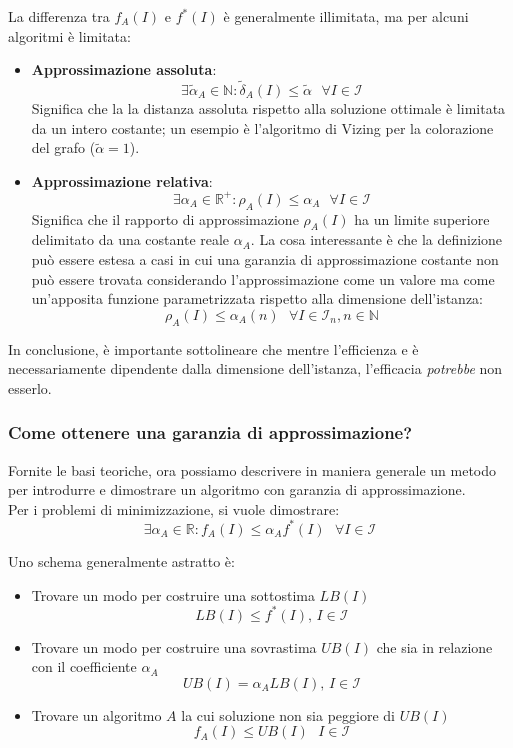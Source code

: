 \documentclass{article}
\begin{document}
La differenza tra $f_A(I)$ e $f^*(I)$ è generalmente illimitata, ma per alcuni algoritmi è limitata:
\begin{itemize}
    \item \textbf{Approssimazione assoluta}: $$\exists\widetilde{\alpha}_A\in\mathbb{N}:\widetilde{\delta}_A(I)\leq\widetilde{\alpha}\text{ }\forall I\in\mathcal{I}$$
          Significa che la la distanza assoluta rispetto alla soluzione ottimale è limitata da
          un intero costante; un esempio è l'algoritmo di Vizing per la colorazione del grafo ($\widetilde{\alpha}=1$).

    \item \textbf{Approssimazione relativa}: $$\exists\alpha_A\in\mathbb{R}^+:\rho_A(I)\leq\alpha_A\text{ }\forall I\in\mathcal{I}$$
          Significa che il rapporto di approssimazione $\rho_A(I)$ ha un limite superiore delimitato da una costante reale $\alpha_A$.
          La cosa interessante è che la definizione può essere estesa a casi in cui una garanzia di approssimazione
          costante non può essere trovata considerando l'approssimazione come un valore ma come un'apposita funzione
          parametrizzata rispetto alla dimensione dell'istanza:
          $$\rho_A(I)\leq\alpha_A(n)\text{ }\forall I\in\mathcal{I}_n,n\in\mathbb{N}$$
\end{itemize}
In conclusione, è importante sottolineare che mentre l'efficienza e è necessariamente
dipendente dalla dimensione dell'istanza, l'efficacia \textit{potrebbe} non esserlo.

\subsubsection{Come ottenere una garanzia di approssimazione?}
Fornite le basi teoriche, ora possiamo descrivere in maniera generale un metodo per introdurre e
dimostrare un algoritmo con garanzia di approssimazione.\\ Per i problemi di minimizzazione,
si vuole dimostrare:
$$\exists\alpha_A\in\mathbb{R}:f_A(I)\leq\alpha_A f^*(I)\text{ }\forall I\in\mathcal{I}$$

Uno schema generalmente astratto è:
\begin{itemize}
    \item Trovare un modo per costruire una sottostima $LB(I)$ $$LB(I)\leq f^*(I)\text{,   }I\in\mathcal{I}$$
    \item Trovare un modo per costruire una sovrastima $UB(I)$ che sia in relazione con il coefficiente $\alpha_A$
          $$UB(I)=\alpha_A LB(I)\text{,   }I\in\mathcal{I}$$
    \item Trovare un algoritmo $A$ la cui soluzione non sia peggiore di $UB(I)$ $$f_A(I)\leq UB(I)\text{   }I\in\mathcal{I}$$
\end{itemize}
\end{document}
